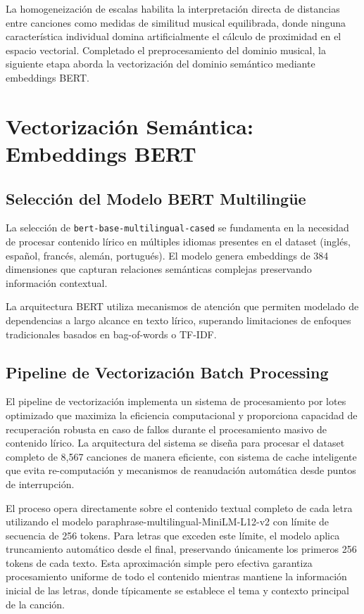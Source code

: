 \documentclass[12pt,a4paper]{report}
\begin{document}
La homogeneización de escalas habilita la interpretación directa de distancias entre canciones como medidas de similitud musical equilibrada, donde ninguna característica individual domina artificialmente el cálculo de proximidad en el espacio vectorial. Completado el preprocesamiento del dominio musical, la siguiente etapa aborda la vectorización del dominio semántico mediante embeddings BERT.

\section{Vectorización Semántica: Embeddings BERT}

\subsection{Selección del Modelo BERT Multilingüe}

La selección de \texttt{bert-base-multilingual-cased} se fundamenta en la necesidad de procesar contenido lírico en múltiples idiomas presentes en el dataset (inglés, español, francés, alemán, portugués). El modelo genera embeddings de 384 dimensiones que capturan relaciones semánticas complejas preservando información contextual.

La arquitectura BERT utiliza mecanismos de atención que permiten modelado de dependencias a largo alcance en texto lírico, superando limitaciones de enfoques tradicionales basados en bag-of-words o TF-IDF.

\subsection{Pipeline de Vectorización Batch Processing}

El pipeline de vectorización implementa un sistema de procesamiento por lotes optimizado que maximiza la eficiencia computacional y proporciona capacidad de recuperación robusta en caso de fallos durante el procesamiento masivo de contenido lírico. La arquitectura del sistema se diseña para procesar el dataset completo de 8,567 canciones de manera eficiente, con sistema de cache inteligente que evita re-computación y mecanismos de reanudación automática desde puntos de interrupción.

El proceso opera directamente sobre el contenido textual completo de cada letra utilizando el modelo paraphrase-multilingual-MiniLM-L12-v2 con límite de secuencia de 256 tokens. Para letras que exceden este límite, el modelo aplica truncamiento automático desde el final, preservando únicamente los primeros 256 tokens de cada texto. Esta aproximación simple pero efectiva garantiza procesamiento uniforme de todo el contenido mientras mantiene la información inicial de las letras, donde típicamente se establece el tema y contexto principal de la canción.
\end{document}

